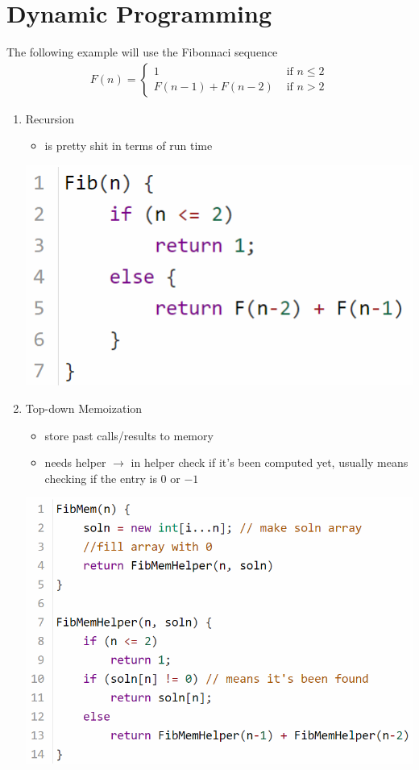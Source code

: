 \section*{Dynamic Programming}
The following example will use the Fibonnaci sequence 
\begin{align*}
    F(n) = 
    \begin{cases}
        1 & \text{ if } n \leq 2 \\
        F(n-1) + F(n-2) &\text{ if } n > 2
    \end{cases}
\end{align*} 

\begin{enumerate}
    \item Recursion
        \begin{itemize}[leftmargin = 1em]
            \item is pretty shit in terms of run time
        \end{itemize}
    \includegraphics[scale = 0.6]{pictures/fibonacci recursion.png}
    \item Top-down Memoization
    \begin{itemize}[leftmargin = 1em]
        \item store past calls/results to memory
        \item needs helper $\rightarrow$ in helper check if it's been computed yet, usually means checking if the entry is 0 or $-1$
    \end{itemize}
    \includegraphics[scale = 0.6]{pictures/fibonacci memoized.png}

\end{enumerate}
